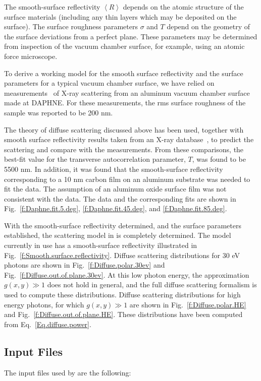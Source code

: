 The smooth-surface reflectivity $\left<R\right>$ depends on the atomic structure of the surface materials (including any thin layers which may be deposited on the surface). The surface roughness parameters $\sigma$ and $T$ depend on the geometry of the surface deviations from a perfect plane. These parameters may be determined from inspection of the vacuum chamber surface, for example, using an atomic force microscope.

To derive a working model for the smooth surface reflectivity and the surface parameters for a typical vacuum chamber surface, we have relied on measurements~\cite{b:mehne} of X-ray scattering from an aluminum vacuum chamber surface made at DAPHNE. For these measurements, the rms surface roughness of the sample was reported to be 200 nm.

The theory of diffuse scattering discussed above has been used, together with smooth surface reflectivity results taken from an X-ray database~\cite{b:henke}, to predict the scattering and compare with the measurements. From these comparisons, the best-fit value for the transverse autocorrelation parameter, $T$, was found to be 5500 nm. In addition, it was found that the smooth-surface reflectivity corresponding to a 10 nm carbon film on an aluminum substrate was needed to fit the data. The assumption of an aluminum oxide surface film was not consistent with the data. The data and the corresponding fits are shown in Fig.~\ref{f:Daphne.fit.5.deg},
\ref{f:Daphne.fit.45.deg}, and \ref{f:Daphne.fit.85.deg}.

With the smooth-surface reflectivity determined, and the surface
parameters established, the scattering model in \srthree is
completely determined. The model currently in use has a smooth-surface
reflectivity illustrated in
Fig.~\ref{f:Smooth.surface.reflectivity}. Diffuse
scattering distributions for 30 eV photons are shown in
Fig.~\ref{f:Diffuse.polar.30ev} and
Fig.~\ref{f:Diffuse.out.of.plane.30ev}. At this low photon
energy, the approximation $g(x,y)\gg 1$ does not hold in general, and
the full diffuse scattering formalism is used to compute these
distributions. Diffuse scattering distributions for high energy
photons, for which $g(x,y)\gg 1$ are shown in
Fig.~\ref{f:Diffuse.polar.HE} and
Fig.~\ref{f:Diffuse.out.of.plane.HE}. These distributions
have been computed from Eq.~\ref{Eq.diffuse.power}.

\subsection{Input Files}
The input files used by \srthree are the following:
